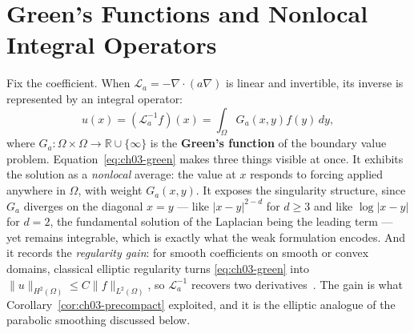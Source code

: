 \section{Green's Functions and Nonlocal Integral Operators}
Fix the coefficient. When $\mathcal{L}_a = -\nabla \cdot (a \nabla)$ is linear
and invertible, its inverse is represented by an integral operator:
\begin{equation}
  u(x) = (\mathcal{L}_a^{-1} f)(x) = \int_\Omega G_a(x, y) f(y) \, dy,
  \label{eq:ch03-green}
\end{equation}
where
$G_a : \Omega \times \Omega \to \mathbb{R} \cup \{\infty\}$
is the \textbf{Green's function} of the boundary value problem.
Equation~\eqref{eq:ch03-green} makes three things visible at once. It exhibits
the solution as a \emph{nonlocal} average: the value at $x$ responds to forcing
applied anywhere in $\Omega$, with weight $G_a(x,y)$. It exposes the singularity
structure, since $G_a$ diverges on the diagonal $x = y$ --- like
$|x-y|^{2-d}$ for $d \ge 3$ and like $\log|x-y|$ for $d=2$, the fundamental
solution of the Laplacian being the leading term --- yet remains integrable,
which is exactly what the weak formulation encodes. And it records the
\emph{regularity gain}: for smooth coefficients on smooth or convex domains,
classical elliptic regularity turns \eqref{eq:ch03-green} into
$\|u\|_{H^2(\Omega)} \le C\|f\|_{L^2(\Omega)}$, so $\mathcal{L}_a^{-1}$ recovers
two derivatives~\cite{evans2010partial, brezis2011functional}. The gain is what
Corollary~\ref{cor:ch03-precompact} exploited, and it is the elliptic analogue of
the parabolic smoothing discussed below.

